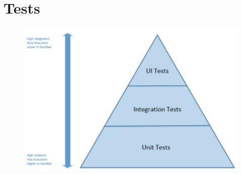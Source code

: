 \documentclass[resume]{subfiles}
\begin{document}
\section{Tests}

\begin{figure}[H]
    \centering
    \includegraphics[width=0.6\columnwidth]{Figures/tests/test_etages.png}
\end{figure}
\end{document}
